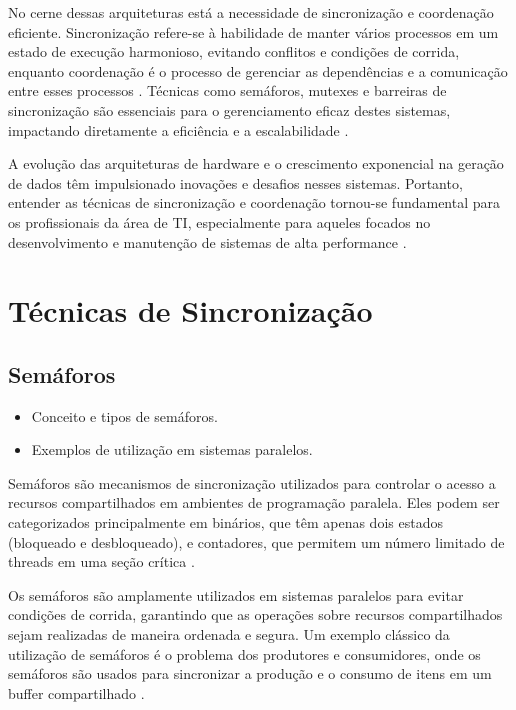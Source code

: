 \documentclass[conference]{IEEEtran}
\begin{document}
No cerne dessas arquiteturas está a necessidade de sincronização 
e coordenação eficiente. 
Sincronização refere-se à habilidade de manter vários processos 
em um estado de execução harmonioso, 
evitando conflitos e condições de corrida, 
enquanto coordenação é o processo de gerenciar 
as dependências e a comunicação 
entre esses processos \cite{andrews2000foundations}. 
Técnicas como semáforos, mutexes e 
barreiras de sincronização são essenciais para o 
gerenciamento eficaz destes sistemas, 
impactando diretamente a eficiência e a escalabilidade \cite{herlihy2011art}.

A evolução das arquiteturas de hardware 
e o crescimento exponencial na geração de dados têm impulsionado 
inovações e desafios nesses sistemas. 
Portanto, entender as técnicas de sincronização e coordenação 
tornou-se fundamental para os profissionais da área de TI, 
especialmente para aqueles focados no desenvolvimento e 
manutenção de sistemas de alta performance \cite{hennessy2011computer}.


\section{Técnicas de Sincronização}
\subsection{Semáforos}
\begin{itemize}
    \item Conceito e tipos de semáforos.
    \item Exemplos de utilização em sistemas paralelos.
\end{itemize}
Semáforos são mecanismos de sincronização utilizados para controlar 
o acesso a recursos compartilhados em ambientes de programação paralela. 
Eles podem ser categorizados principalmente em binários, 
que têm apenas dois estados (bloqueado e desbloqueado), 
e contadores, que permitem um número limitado de threads 
em uma seção crítica \cite{dijkstra1968semaphores}. 

Os semáforos são amplamente utilizados em sistemas paralelos 
para evitar condições de corrida, garantindo que as operações 
sobre recursos compartilhados sejam realizadas de maneira ordenada e segura. 
Um exemplo clássico da utilização de semáforos é o problema dos produtores e consumidores, 
onde os semáforos são usados para sincronizar a produção e 
o consumo de itens em um buffer compartilhado \cite{tanenbaum2007modern}.
\end{document}

